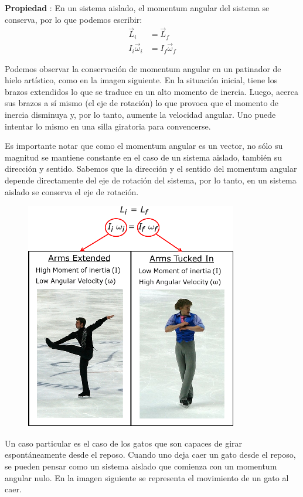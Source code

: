 \documentclass[letterpaper]{article}
\newcounter{propiedades}
\newcommand{\propi}{\stepcounter{propiedades} \textbf{Propiedad \thepropiedades}: }
\newenvironment{prop}
{ \begin{framed} \propi}
{ \end{framed} }
\begin{document}
\begin{prop}
En un sistema aislado, el momentum angular del sistema se conserva, por lo que podemos escribir:
\begin{align*}
\vec{L}_i &= \vec{L}_f \\
I_i\vec{\omega}_i &= I_f\vec{\omega}_f
\end{align*}
\end{prop}

Podemos observar la conservación de momentum angular en un patinador de hielo artístico, como en la imagen siguiente. En la situación inicial, tiene los brazos extendidos lo que se traduce en un alto momento de inercia. Luego, acerca sus brazos a sí mismo (el eje de rotación) lo que provoca que el momento de inercia disminuya y, por lo tanto, aumente la velocidad angular. Uno puede intentar lo mismo en una silla giratoria para convencerse.

Es importante notar que como el momentum angular es un vector, no sólo su magnitud se mantiene constante en el caso de un sistema aislado, también su dirección y sentido. Sabemos que la dirección y el sentido del momentum angular depende directamente del eje de rotación del sistema, por lo tanto, en un sistema aislado se conserva el eje de rotación.
\begin{figure}[h]
\centering
\includegraphics{ang_cons.png}
\end{figure}

Un caso particular es el caso de los gatos que son capaces de girar espontáneamente desde el reposo. Cuando uno deja caer un gato desde el reposo, se pueden pensar como un sistema aislado que comienza con un momentum angular nulo. En la imagen siguiente se representa el movimiento de un gato al caer.
\end{document}
